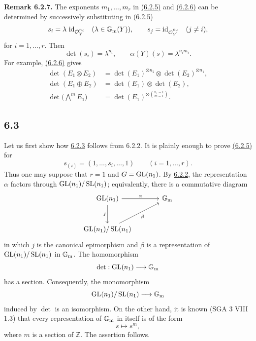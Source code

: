 \textbf{Remark 6.2.7.}
The exponents $m_1,\ldots,m_r$ in \hyperlink{sga6.e10.eq.6-2-5}{(6.2.5)} and \hyperlink{sga6.e10.eq.6-2-6}{(6.2.6)} can be determined by
successively substituting in \hyperlink{sga6.e10.eq.6-2-5}{(6.2.5)}
\[
s_i=\lambda\,\operatorname{id}_{\mathcal O_Y^{n_i}}\quad(\lambda\in\mathbb G_{\mathrm m}(Y)),
\qquad
s_j=\operatorname{id}_{\mathcal O_Y^{n_j}}\quad(j\ne i),
\]
for $i=1,\ldots,r$. Then
\[
\det(s_i)=\lambda^{n_i},
\qquad
\alpha(Y)(s)=\lambda^{n_i m_i}.
\]
For example, \hyperlink{sga6.e10.eq.6-2-6}{(6.2.6)} gives
\begin{align}
\det(E_1\otimes E_2)
&=\det(E_1)^{\otimes n_2}\otimes\det(E_2)^{\otimes n_1},
\tag{6.2.8}\\
\det(E_1\oplus E_2)
&=\det(E_1)\otimes\det(E_2),
\tag{6.2.9}\\
\det\bigl(\bigwedge\nolimits^m E_1\bigr)
&=\det(E_1)^{\otimes\binom{n_1-1}{m-1}}.
\tag{6.2.10}
\end{align}

\subsection*{6.3}
Let us first show how \hyperlink{sga6.e10.cor.6-2-3}{6.2.3} follows from 6.2.2. It is plainly enough to prove
\hyperlink{sga6.e10.eq.6-2-5}{(6.2.5)} for
\[
s_{(i)}=(1,\ldots,s_i,\ldots,1)\qquad(i=1,\ldots,r).
\]
Thus one may suppose that $r=1$ and $G=\operatorname{GL}(n_1)$. By \hyperlink{sga6.e10.prop.6-2-2}{6.2.2}, the
representation $\alpha$ factors through $\operatorname{GL}(n_1)/\operatorname{SL}(n_1)$; equivalently,
there is a commutative diagram
\[
\begin{tikzcd}[column sep=large,row sep=large]
\GL(n_1) \arrow[r,"\alpha"] \arrow[d,"j"'] & \Gm\\
\GL(n_1)/\SL(n_1) \arrow[ur,"\beta"'] &
\end{tikzcd}
\]
in which $j$ is the canonical epimorphism and $\beta$ is a representation
of $\operatorname{GL}(n_1)/\operatorname{SL}(n_1)$ in $\mathbb G_{\mathrm m}$. The homomorphism
\[
\det:\operatorname{GL}(n_1)\longrightarrow\mathbb G_{\mathrm m}
\]
has a section. Consequently, the monomorphism
\[
\operatorname{GL}(n_1)/\operatorname{SL}(n_1)\longrightarrow\mathbb G_{\mathrm m}
\]
induced by $\det$ is an isomorphism. On the other hand, it is known
(SGA 3 VIII 1.3) that every representation of $\mathbb G_{\mathrm m}$ in itself is of the
form
\[
s\longmapsto s^m,
\]
where $m$ is a section of $\mathbb Z$. The assertion follows.


